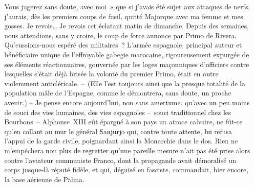\documentclass[french,twoside]{book} %
\newcommand{\astertri}{\medskip\par\centerline{\color{rubric}\large\selectfont{\syms ✻\,✻\,✻}}\medskip\par}%
\begin{document}
\astertri

\noindent Vous jugerez sans doute, avec moi » que si j’avais été sujet aux attaques de nerfs, j’aurais, dès les premiers coups de fusil, quitté Majorque avec ma femme et mes gosses. Je revois… Je revois cet éclatant matin de dimanche. Depuis des semaines, nous attendions, sans y croire, le coup de force annonce par Primo de Rivera. Qu’eussions-nous espéré des militaires ? L’armée espagnole, principal auteur et bénéficiaire unique de l’effroyable gabegie marocaine, rigoureusement expurgée de ses éléments réactionnaires, gouvernée par les loges maçonniques d’officiers contre lesquelles s’était déjà brisée la volonté du premier Primo, était en outre violemment anticléricale. – (Elle l’est toujours ainsi que la presque totalité de la population mâle de l’Espagne, comme le démontrera, sans doute, un proche avenir.) – Je pense encore aujourd’hui, non sans amertume, qu’avec un peu moins de souci des vies humaines, des vies espagnoles – souci traditionnel chez les Bourbons – Alphonse \textsc{XIII} eût épargné à son pays un atroce calvaire, ne fût-ce qu’en collant au mur le général Sanjurjo qui, contre toute attente, lui refusa l’appui de la garde civile, poignardant ainsi la Monarchie dans le dos. Rien ne m’empêchera non plus de regretter qu’une pareille mesure n’ait pas été prise alors contre l’aviateur communiste Franco, dont la propagande avait démoralisé un corps jusque-là réputé fidèle, et qui, déguisé en fasciste, commandait, hier encore, la base aérienne de Palma.\par

\astertri
\end{document}
